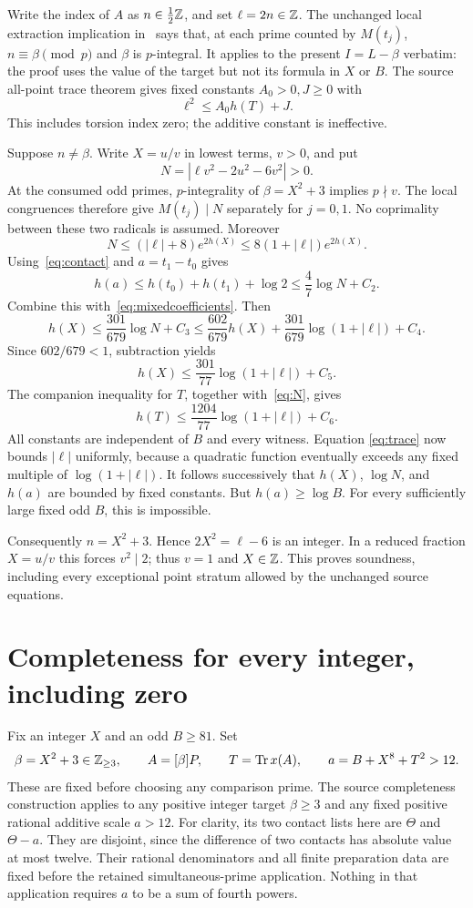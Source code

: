 \documentclass[11pt,a4paper]{article}
\theoremstyle{remark}\newtheorem{remark}[theorem]{Remark}
\DeclareMathOperator{\Tr}{Tr}\DeclareMathOperator{\rad}{rad}
\begin{document}
Write the index of $A$ as $n\in\tfrac12\mathbb Z$, and set $\ell=2n\in\mathbb Z$.
The unchanged local extraction implication in~\cite{Parent} says that,
at each prime counted by $M(t_j)$, $n\equiv\beta\pmod p$ and $\beta$
is $p$-integral. It applies to the present $I=L-\beta$ verbatim: the
proof uses the value of the target but not its formula in $X$ or $B$.
The source all-point trace theorem gives fixed constants $A_0>0,J\ge0$
with
\begin{equation}\label{eq:trace}
 \ell^2\le A_0 h(T)+J.
\end{equation}
This includes torsion index zero; the additive constant is ineffective.

Suppose $n\ne\beta$. Write $X=u/v$ in lowest terms, $v>0$, and put
\[
 N=|\ell v^2-2u^2-6v^2|>0.
\]
At the consumed odd primes, $p$-integrality of $\beta=X^2+3$ implies
$p\nmid v$. The local congruences therefore give
$M(t_j)\mid N$ separately for $j=0,1$. No coprimality between these
two radicals is assumed. Moreover
\begin{equation}\label{eq:N}
 N\le (|\ell|+8)e^{2h(X)}
 \le8(1+|\ell|)e^{2h(X)}.
\end{equation}
Using~\eqref{eq:contact} and $a=t_1-t_0$ gives
\[
 h(a)\le h(t_0)+h(t_1)+\log2\le\frac47\log N+C_2.
\]
Combine this with~\eqref{eq:mixedcoefficients}. Then
\[
 h(X)\le\frac{301}{679}\log N+C_3
 \le\frac{602}{679}h(X)+\frac{301}{679}\log(1+|\ell|)+C_4.
\]
Since $602/679<1$, subtraction yields
\[
 h(X)\le\frac{301}{77}\log(1+|\ell|)+C_5.
\]
The companion inequality for $T$, together with~\eqref{eq:N}, gives
\[
 h(T)\le\frac{1204}{77}\log(1+|\ell|)+C_6.
\]
All constants are independent of $B$ and every witness. Equation
\eqref{eq:trace} now bounds $|\ell|$ uniformly, because a quadratic
function eventually exceeds any fixed multiple of $\log(1+|\ell|)$.
It follows successively that $h(X)$, $\log N$, and $h(a)$ are bounded
by fixed constants. But $h(a)\ge\log B$. For every sufficiently large
fixed odd $B$, this is impossible.

Consequently $n=X^2+3$. Hence $2X^2=\ell-6$ is an integer. In a reduced
fraction $X=u/v$ this forces $v^2\mid2$; thus $v=1$ and $X\in\mathbb Z$.
This proves soundness, including every exceptional point stratum
allowed by the unchanged source equations.

\section{Completeness for every integer, including zero}
Fix an integer $X$ and an odd $B\ge81$. Set
\[
 \beta=X^2+3\in\Z_{\ge3},\qquad A=[\beta]P,
 \qquad T=\Tr x(A),\qquad a=B+X^8+T^2>12.
\]
These are fixed before choosing any comparison prime. The source
completeness construction applies to any positive integer target
$\beta\ge3$ and any fixed positive rational additive scale $a>12$.
For clarity, its two contact lists here are $\Theta$ and $\Theta-a$.
They are disjoint, since the difference of two contacts has absolute
value at most twelve. Their rational denominators and all finite
preparation data are fixed before the retained simultaneous-prime
application. Nothing in that application requires $a$ to be a sum of
fourth powers.
\end{document}
